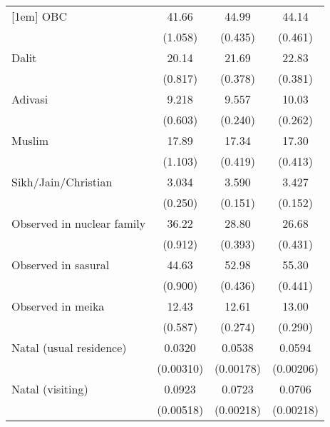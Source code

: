 {\begin{tabular}{l*{3}{c}}
[1em]
OBC                 &       41.66\sym{***}&       44.99\sym{***}&       44.14\sym{***}\\
                    &     (1.058)         &     (0.435)         &     (0.461)         \\
[1em]
Dalit               &       20.14\sym{***}&       21.69\sym{***}&       22.83\sym{***}\\
                    &     (0.817)         &     (0.378)         &     (0.381)         \\
[1em]
Adivasi             &       9.218\sym{***}&       9.557\sym{***}&       10.03\sym{***}\\
                    &     (0.603)         &     (0.240)         &     (0.262)         \\
[1em]
Muslim              &       17.89\sym{***}&       17.34\sym{***}&       17.30\sym{***}\\
                    &     (1.103)         &     (0.419)         &     (0.413)         \\
[1em]
Sikh/Jain/Christian &       3.034\sym{***}&       3.590\sym{***}&       3.427\sym{***}\\
                    &     (0.250)         &     (0.151)         &     (0.152)         \\
[1em]
Observed in nuclear family&       36.22\sym{***}&       28.80\sym{***}&       26.68\sym{***}\\
                    &     (0.912)         &     (0.393)         &     (0.431)         \\
[1em]
Observed in sasural &       44.63\sym{***}&       52.98\sym{***}&       55.30\sym{***}\\
                    &     (0.900)         &     (0.436)         &     (0.441)         \\
[1em]
Observed in meika   &       12.43\sym{***}&       12.61\sym{***}&       13.00\sym{***}\\
                    &     (0.587)         &     (0.274)         &     (0.290)         \\
[1em]
Natal (usual residence)&      0.0320\sym{***}&      0.0538\sym{***}&      0.0594\sym{***}\\
                    &   (0.00310)         &   (0.00178)         &   (0.00206)         \\
[1em]
Natal (visiting)    &      0.0923\sym{***}&      0.0723\sym{***}&      0.0706\sym{***}\\
                    &   (0.00518)         &   (0.00218)         &   (0.00218)         \\

\end{tabular}}
